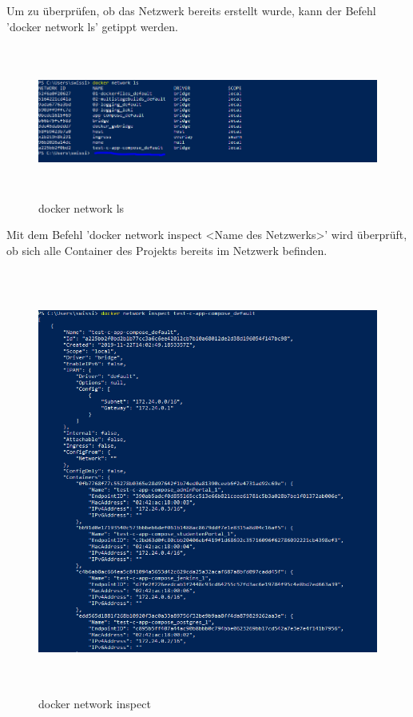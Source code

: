 \documentclass[a4paper,12pt,oneside]{book}
\begin{document}
Um zu überprüfen, ob das Netzwerk bereits erstellt wurde, kann der Befehl 'docker network ls' getippt werden.
\newline
\begin{figure}[h!]
	\begin{center}
		\includegraphics[width=17cm, height=5cm]{docker-network-ls.PNG}
		\caption{docker network ls} 
		\label{docker network ls} 
	\end{center}
\end{figure}
\newline
Mit dem Befehl 'docker network inspect <Name des Netzwerks>' wird überprüft, ob sich alle Container des Projekts bereits im Netzwerk befinden.
\newpage
\begin{figure}[h!]
	\begin{center}
		\includegraphics[width=14cm, height=14cm]{network-inspect.PNG}
		\caption{docker network inspect} 
		\label{docker network inspect} 
	\end{center}
\end{figure}
\newpage
\end{document}
